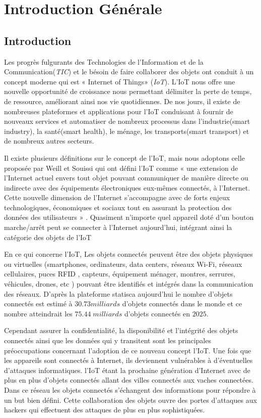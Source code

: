 \chapter*{Introduction Générale}
\section*{Introduction} 	
Les progrès fulgurants des Technologies de l’Information et de la Communication({\emph{TIC}}) et le bésoin de faire collaborer des objets ont conduit à un concept moderne qui est « Internet of Things» (\emph{IoT}). L'IoT nous offre une nouvelle opportunité de croissance nous permettant délimiter la perte de temps, de ressource, améliorant ainsi nos vie quotidiennes. De nos jours, il existe de nombreuses plateformes et applications pour l’IoT conduisant à fournir de nouveaux services et automatiser de nombreux processus dans l'industrie(smart industry), la santé(smart health), le ménage, les transports(smart transport) et de nombreux autres secteurs.

Il existe plusieurs définitions sur le concept de l’IoT, mais nous adoptons celle proposée par Weill et Souissi qui ont défini l’IoT comme « une extension de l'Internet actuel envers tout objet pouvant communiquer de manière directe ou indirecte avec des équipements électroniques eux-mêmes connectés, à l'Internet. Cette nouvelle dimension de l'Internet s'accompagne avec de forts enjeux technologiques, économiques et sociaux tout en assurant la protection des données des utilisateurs » \citep{refdiot}. Quasiment n'importe quel appareil doté d'un bouton marche/arrêt peut se connecter à l'Internet aujourd'hui, intégrant ainsi la catégorie des objets de l'IoT \citep{ciscorefiot} 

En ce qui concerne l'IoT, Les objets connectés peuvent être des objets  physiques ou virtuelles (smartphones, ordinateurs, data centers, réseaux Wi-Fi, réseaux cellulaires, puces RFID , capteurs, équipement ménager, montres, serrures, véhicules, drones, etc ) pouvant être identifiés et intégrés dans la communication des réseaux.
D'après la plateforme statisca \citep{refstatic} aujourd'hui le nombre d'objets connectés est estimé à $30.73 milliards$ d'objets connectés dans le monde et ce nombre atteindrait les $75.44\; milliards$ d'objets connectés en $2025$.

Cependant assurer la confidentialité, la disponibilité et l'intégrité des objets connectés ainsi que les données qui y transitent sont les principales préoccupations concernant l'adoption de ce nouveau concept l'IoT. Une fois que les appareils sont connectés à Internet, ils deviennent vulnérables à d'éventuelles d'attaques informatiques. l'IoT étant la prochaine génération  d'Internet \citep{cisco} avec de plus en plus d'objets connectés allant des villes connectés aux vaches connectées. Dans ce réseau les objets connectés s’échangent des informations pour répondre à un but bien défini. Cette collaboration des objets ouvre des portes d’attaques aux hackers qui effectuent des attaques de plus en plus sophistiquées.

